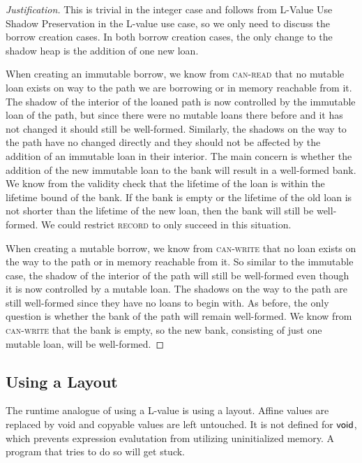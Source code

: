 \begin{proof}[Justification]
  This is trivial in the integer case and follows from L-Value Use Shadow Preservation
  in the L-value use case, so we only need to discuss the borrow creation cases.
  In both borrow creation cases, the only change to the shadow heap is the addition of
  one new loan.

  When creating an immutable borrow, we know from \textsc{can-read} that
  no mutable loan exists on way to the path we are borrowing or in memory reachable from it.
  The shadow of the interior of the loaned path is now controlled by the immutable loan
  of the path, but since there were no mutable loans there before and it has not changed
  it should still be well-formed. Similarly, the shadows on the way to the path have no changed
  directly and they should not be affected by the addition of an immutable loan in their
  interior. The main concern is whether the addition of the new immutable loan to the bank 
  will result in a well-formed bank. We know from the validity check that the lifetime
  of the loan is within the lifetime bound of the bank. If the bank is empty or
  the lifetime of the old loan is not shorter than the lifetime of the new loan, then
  the bank will still be well-formed. We could restrict \textsc{record} to only succeed
  in this situation.

  When creating a mutable borrow, we know from \textsc{can-write} that
  no loan exists on the way to the path or in memory reachable from it.
  So similar to the immutable case, the shadow of the interior of the path will still
  be well-formed even though it is now controlled by a mutable loan.
  The shadows on the way to the path are still well-formed since they have no loans to begin with.
  As before, the only question is whether the bank of the path will remain well-formed.
  We know from \textsc{can-write} that the bank is empty, so the new bank, consisting of
  just one mutable loan, will be well-formed.
\end{proof}

\subsection*{Using a Layout}
The runtime analogue of using a L-value is using a layout.
Affine values are replaced by void and copyable values are left untouched.
It is not defined for $\mathsf{void}$, which prevents expression evalutation from utilizing
uninitialized memory. A program that tries to do so will get stuck.
\newline


